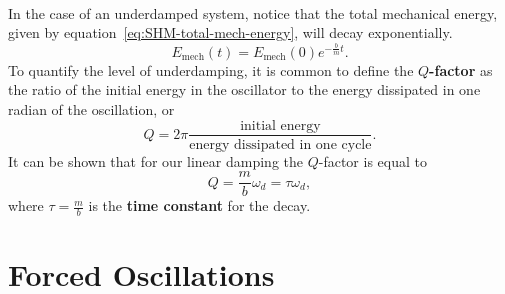 \documentclass[../classical_mechanics.tex]{subfiles}
\begin{document}
        \paragraph{}
        In the case of an underdamped system, notice that the total mechanical energy, given by equation~\ref{eq:SHM-total-mech-energy}, will decay exponentially.
        \begin{equation}
            E_\text{mech}(t)=E_\text{mech}(0)e^{-\frac{b}{m}t}.
        \end{equation}
        To quantify the level of underdamping, it is common to define the \textbf{$Q$-factor} as the ratio of the initial energy in the oscillator to the energy dissipated in one radian of the oscillation, or
        \begin{equation}
            Q=2\pi\frac{\text{initial energy}}{\text{energy dissipated in one cycle}}.
        \end{equation}
        It can be shown that for our linear damping the $Q$-factor is equal to
        \begin{equation}
            Q=\frac{m}{b}\omega_d=\tau\omega_d,
        \end{equation}
        where $\tau=\frac{m}{b}$ is the \textbf{time constant} for the decay.


    \section{Forced Oscillations}\label{sec:forced-oscillations}
\end{document}
